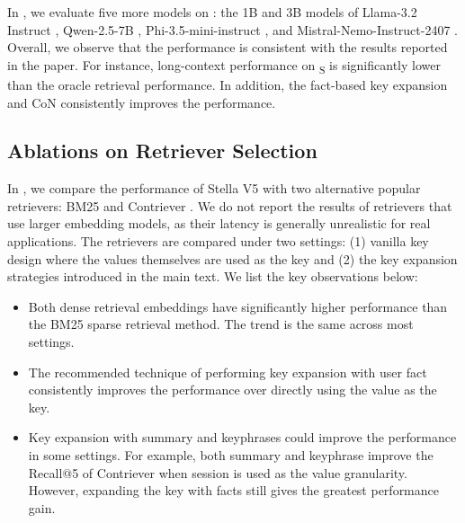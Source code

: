 In , we evaluate five more models on \BENCHMARK{}: the 1B and 3B models of Llama-3.2 Instruct \citep{dubey2024llama}, Qwen-2.5-7B \citep{qwen2.5}, Phi-3.5-mini-instruct \citep{DBLP:journals/corr/abs-2404-14219}, and Mistral-Nemo-Instruct-2407 \citep{mistral2024nemo}. Overall, we observe that the performance is consistent with the results reported in the paper. For instance, long-context performance on \BENCHMARK\textsubscript{\textsc{S}} is significantly lower than the oracle retrieval performance. In addition, the fact-based key expansion and CoN consistently improves the performance.




\subsection{Ablations on Retriever Selection}
\label{appendix-retriever}
\label{appendix-key-merging}

In , we compare the performance of Stella V5 with two alternative popular retrievers: BM25 \citep{DBLP:journals/ftir/RobertsonZ09} and Contriever \citep{DBLP:journals/tmlr/IzacardCHRBJG22}. We do not report the results of retrievers that use larger embedding models, as their latency is generally unrealistic for real applications. The retrievers are compared under two settings: (1) vanilla key design where the values themselves are used as the key and (2) the key expansion strategies introduced in the main text. We list the key observations below: 

\begin{itemize}
    \item Both dense retrieval embeddings have significantly higher performance than the BM25 sparse retrieval method. The trend is the same across most settings.
    \item The recommended technique of performing key expansion with user fact consistently improves the performance over directly using the value as the key. 
    \item Key expansion with summary and keyphrases could improve the performance in some settings. For example, both summary and keyphrase improve the Recall@5 of Contriever when session is used as the value granularity. However, expanding the key with facts still gives the greatest performance gain.
\end{itemize}




